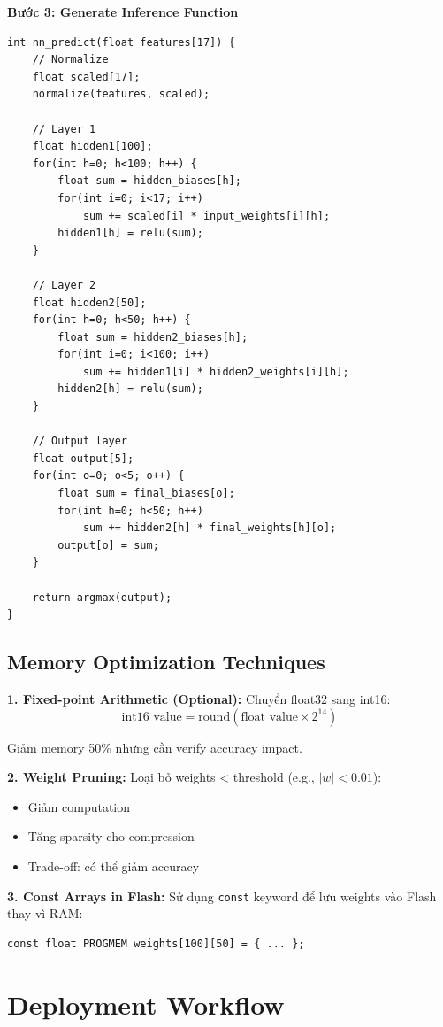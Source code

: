 \textbf{Bước 3: Generate Inference Function}
\begin{verbatim}
int nn_predict(float features[17]) {
    // Normalize
    float scaled[17];
    normalize(features, scaled);
    
    // Layer 1
    float hidden1[100];
    for(int h=0; h<100; h++) {
        float sum = hidden_biases[h];
        for(int i=0; i<17; i++)
            sum += scaled[i] * input_weights[i][h];
        hidden1[h] = relu(sum);
    }
    
    // Layer 2
    float hidden2[50];
    for(int h=0; h<50; h++) {
        float sum = hidden2_biases[h];
        for(int i=0; i<100; i++)
            sum += hidden1[i] * hidden2_weights[i][h];
        hidden2[h] = relu(sum);
    }
    
    // Output layer
    float output[5];
    for(int o=0; o<5; o++) {
        float sum = final_biases[o];
        for(int h=0; h<50; h++)
            sum += hidden2[h] * final_weights[h][o];
        output[o] = sum;
    }
    
    return argmax(output);
}
\end{verbatim}

\subsection{Memory Optimization Techniques}

\textbf{1. Fixed-point Arithmetic (Optional):}
Chuyển float32 sang int16:
\begin{equation}
\text{int16\_value} = \text{round}(\text{float\_value} \times 2^{14})
\end{equation}

Giảm memory 50\% nhưng cần verify accuracy impact.

\textbf{2. Weight Pruning:}
Loại bỏ weights < threshold (e.g., $|w| < 0.01$):
\begin{itemize}
    \item Giảm computation
    \item Tăng sparsity cho compression
    \item Trade-off: có thể giảm accuracy
\end{itemize}

\textbf{3. Const Arrays in Flash:}
Sử dụng \texttt{const} keyword để lưu weights vào Flash thay vì RAM:
\begin{verbatim}
const float PROGMEM weights[100][50] = { ... };
\end{verbatim}

\section{Deployment Workflow}
\label{sec:deployment-workflow}

